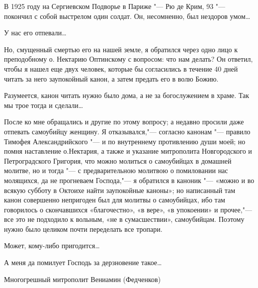 \mychapterending

 

{\centering{}

}

\begin{mymulticols}

В 1925 году на Сергиевском Подворье в Париже "--- Рю де Крим, 93 "--- покончил с собой выстрелом один солдат. Он, несомненно, был нездоров умом…

У нас его отпевали…

Но, смущенный смертью его на нашей земле, я обратился через одно лицо к преподобному о. Нектарию Оптинскому с вопросом: что нам делать? Он ответил, чтобы я нашел еще двух человек, которые бы согласились в течение 40 дней читать за него заупокойный канон, а затем предать его в волю Божию.

Разумеется, канон читать нужно было дома, а не за богослужением в храме. Так мы трое тогда и сделали…

После ко мне обращались и другие по этому вопросу; а недавно просили даже отпевать самоубийцу женщину. Я отказывался,"--- согласно канонам "--- правило Тимофея Александрийского "--- и по внутреннему противлению души моей; но помня наставление о.Нектария, а также и указание митрополита Новгородского и Петроградского Григория, что можно молиться о самоубийцах в домашней молитве, но и тогда "--- с предварительною молитвою о помиловании нас молящихся, да не прогневаем Господа,"--- я обратился в каноник "--- «можно и во всякую субботу в Oктоихе найти заупокойные каноны»; но написанный там канон совершенно непригоден был для молитвы о самоубийцах, ибо там говорилось о скончавшихся «благочестно», «в вере», «в упокоении» и прочее,"--- все это не подходило к вольным, «не в сумасшествии», самоубийцам. Поэтому нужно было целиком почти переделать все тропари.

Может, кому-либо пригодится…

А меня да помилует Господь за дерзновение такое…

Многогрешный митрополит Вениамин (Федченков)

 {\centering {}

}



\end{mymulticols}
